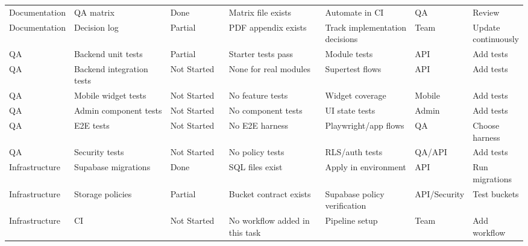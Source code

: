 \begin{longtable}{p{0.12\linewidth}p{0.2\linewidth}p{0.12\linewidth}p{0.2\linewidth}p{0.18\linewidth}p{0.08\linewidth}p{0.14\linewidth}}
Documentation & QA matrix & Done & Matrix file exists & Automate in CI & QA & Review \\
Documentation & Decision log & Partial & PDF appendix exists & Track implementation decisions & Team & Update continuously \\
QA & Backend unit tests & Partial & Starter tests pass & Module tests & API & Add tests \\
QA & Backend integration tests & Not Started & None for real modules & Supertest flows & API & Add tests \\
QA & Mobile widget tests & Not Started & No feature tests & Widget coverage & Mobile & Add tests \\
QA & Admin component tests & Not Started & No component tests & UI state tests & Admin & Add tests \\
QA & E2E tests & Not Started & No E2E harness & Playwright/app flows & QA & Choose harness \\
QA & Security tests & Not Started & No policy tests & RLS/auth tests & QA/API & Add tests \\
Infrastructure & Supabase migrations & Done & SQL files exist & Apply in environment & API & Run migrations \\
Infrastructure & Storage policies & Partial & Bucket contract exists & Supabase policy verification & API/Security & Test buckets \\
Infrastructure & CI & Not Started & No workflow added in this task & Pipeline setup & Team & Add workflow \\
\bottomrule
\end{longtable}
